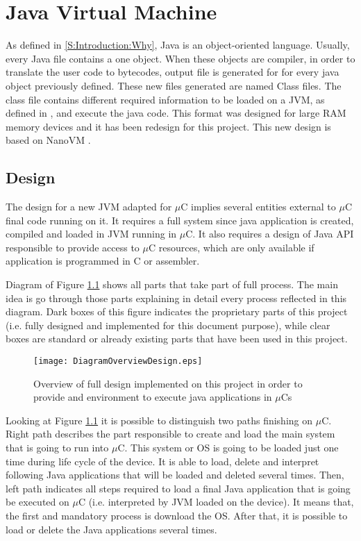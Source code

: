 \chapter{Java Virtual Machine}\label{C:JVM}
As defined in \ref{S:Introduction:Why}, Java is an object-oriented language. Usually, every Java file contains a one object. When these objects are compiler, in order to translate the user code to bytecodes, output file is generated for for every java object previously defined. These new files generated are named Class files. The class file contains different required information to be loaded on a JVM, as defined in \cite{Art:JVMSE7}, and execute the java code. This format was designed for large RAM memory devices and it has been redesign for this project. This new design is based on NanoVM \cite{Art:NanoVM}.

\section{Design}\label{S:JVM:Design}
The design for a new JVM adapted for $\mu$C implies several entities external to $\mu$C final code running on it. It requires a full system since java application is created, compiled and loaded in JVM running in $\mu$C. It also requires a design of Java API responsible to provide access to $\mu$C resources, which are only available if application is programmed in C or assembler.

Diagram of Figure \ref{fig:C:JVM:OverviewDiagram} shows all parts that take part of full process. The main idea is go through those parts explaining in detail every process reflected in this diagram. Dark boxes of this figure indicates the proprietary parts of this project (i.e. fully designed and implemented for this document purpose), while clear boxes are standard or already existing parts that have been used in this project.

\begin{figure}[H]
\centering
\texttt{[image: DiagramOverviewDesign.eps]}
\caption{Overview of full design implemented on this project in order to provide and environment to execute java applications in $\mu$Cs}
\label{fig:C:JVM:OverviewDiagram}
\end{figure}

Looking at Figure \ref{fig:C:JVM:OverviewDiagram} it is possible to distinguish two paths finishing on $\mu$C. Right path describes the part responsible to create and load the main system that is going to run into $\mu$C. This system or OS is going to be loaded just one time during life cycle of the device. It is able to load, delete and interpret following Java applications that will be loaded and deleted several times. Then, left path indicates all steps required to load a final Java application that is going be executed on $\mu$C (i.e. interpreted by JVM loaded on the device). It means that, the first and mandatory process is download the OS. After that, it is possible to load or delete the Java applications several times.

